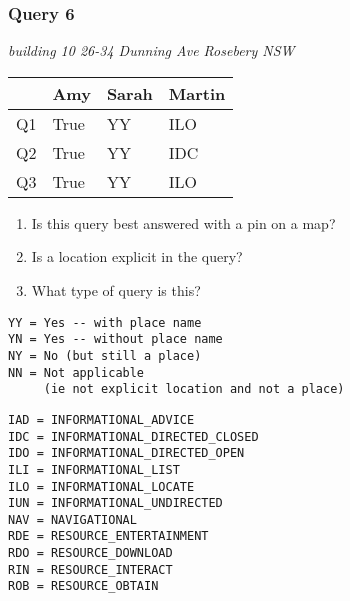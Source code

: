 \begin{frame}[fragile]
\frametitle{Query 6}
\vspace{1em}

\emph{building 10 26-34 Dunning Ave  Rosebery NSW}

\vfill

\begin{table}
  \centering
  \begin{tabular}{ l l l l }
    & \textbf{Amy} & \textbf{Sarah} & \textbf{Martin}\\
    \toprule
    Q1 & True & YY & ILO\\
Q2 & True & YY & IDC\\
Q3 & True & YY & ILO\\
    \bottomrule
  \end{tabular}
\end{table}

\vfill

\tiny{

\begin{enumerate}
\item Is this query best answered with a pin on a map?
\item Is a location explicit in the query?
\item What type of query is this?
\end{enumerate}

\vfill

\begin{multicols}{2}
\begin{verbatim}
YY = Yes -- with place name
YN = Yes -- without place name
NY = No (but still a place)
NN = Not applicable 
     (ie not explicit location and not a place)
\end{verbatim}

\columnbreak
\begin{verbatim}
IAD = INFORMATIONAL_ADVICE
IDC = INFORMATIONAL_DIRECTED_CLOSED
IDO = INFORMATIONAL_DIRECTED_OPEN
ILI = INFORMATIONAL_LIST
ILO = INFORMATIONAL_LOCATE
IUN = INFORMATIONAL_UNDIRECTED
NAV = NAVIGATIONAL
RDE = RESOURCE_ENTERTAINMENT
RDO = RESOURCE_DOWNLOAD
RIN = RESOURCE_INTERACT
ROB = RESOURCE_OBTAIN
\end{verbatim}
\end{multicols}
}

\end{frame}


